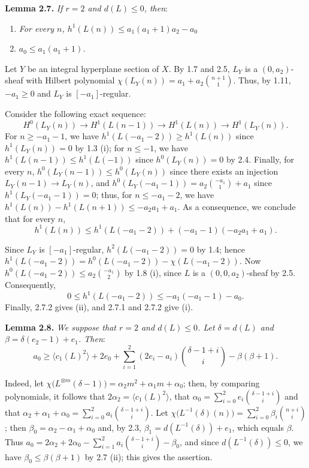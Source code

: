 \textbf{Lemma 2.7.} \emph{If \(r=2\) and \(d(L)\le0\), then}:
\begin{enumerate}[label=(\roman*)]
\item \emph{For every \(n\), \(h^1(L(n))\le a_1(a_1+1)a_2-a_0\)}
\item \emph{\(a_0\le a_1(a_1+1)\).}
\end{enumerate}

Let \(Y\) be an integral hyperplane section of \(X\). By 1.7 and 2.5, \(L_Y\) is a \((0,a_2)\)-sheaf with Hilbert polynomial \(\chi(L_Y(n))=a_1+a_2\binom{n+1}{1}\). Thus, by 1.11, \(-a_1\ge0\) and \(L_Y\) is \([-a_1]\)-regular.

Consider the following exact sequence:
\[
H^0(L_Y(n))\longrightarrow H^1(L(n-1))
\longrightarrow H^1(L(n))\longrightarrow H^1(L_Y(n)).
\]
For \(n\ge -a_1-1\), we have \(h^1(L(-a_1-2))\ge h^1(L(n))\) since \(h^1(L_Y(n))=0\) by 1.3 (i); for \(n\le -1\), we have \(h^1(L(n-1))\le h^1(L(-1))\) since \(h^0(L_Y(n))=0\) by 2.4. Finally, for every \(n\), \(h^0(L_Y(n-1))\le h^0(L_Y(n))\) since there exists an injection \(L_Y(n-1)\longrightarrow L_Y(n)\), and \(h^0(L_Y(-a_1-1))=a_2\binom{-a_1}{1}+a_1\) since \(h^1(L_Y(-a_1-1))=0\); thus, for \(n\le -a_1-2\), we have \(h^1(L(n))-h^1(L(n+1))\le -a_2a_1+a_1\). As a consequence, we conclude that for every \(n\),
\[
h^1(L(n))\le h^1(L(-a_1-2))+(-a_1-1)(-a_2a_1+a_1).
\tag{2.7.1}
\]

%
Since \(L_Y\) is \([-a_1]\)-regular, \(h^2(L(-a_1-2))=0\) by 1.4; hence \(h^1(L(-a_1-2))=h^0(L(-a_1-2))-\chi(L(-a_1-2))\). Now \(h^0(L(-a_1-2))\le a_2\binom{-a_1}{2}\) by 1.8 (i), since \(L\) is a \((0,0,a_2)\)-sheaf by 2.5. Consequently,
\[
0\le h^1(L(-a_1-2))\le -a_1(-a_1-1)-a_0.
\tag{2.7.2}
\]
Finally, 2.7.2 gives (ii), and 2.7.1 and 2.7.2 give (i).

\textbf{Lemma 2.8.} \emph{We suppose that \(r=2\) and \(d(L)\le0\). Let \(\delta=d(L)\) and \(\beta=\delta(e_2-1)+e_1\). Then}:
\[
a_0\ge
\langle c_1(L)^2\rangle+2e_0+
\sum_{i=1}^{2}(2e_i-a_i)\binom{\delta-1+i}{i}
-\beta(\beta+1).
\]

Indeed, let \(\chi\bigl(L^{\otimes m}(\delta-1)\bigr)=\alpha_2m^2+\alpha_1m+\alpha_0\); then, by comparing polynomials, it follows that \(2\alpha_2=\langle c_1(L)^2\rangle\), that \(\alpha_0=\sum_{i=0}^{2}e_i\binom{\delta-1+i}{i}\) and that \(\alpha_2+\alpha_1+\alpha_0=\sum_{i=0}^{2}a_i\binom{\delta-1+i}{i}\). Let \(\chi\bigl(L^{-1}(\delta)(n)\bigr)=\sum_{i=0}^{2}\beta_i\binom{n+i}{i}\); then \(\beta_0=\alpha_2-\alpha_1+\alpha_0\) and, by 2.3, \(\beta_1=d(L^{-1}(\delta))+e_1\), which equals \(\beta\). Thus \(a_0=2\alpha_2+2\alpha_0-\sum_{i=1}^{2}a_i\binom{\delta-1+i}{i}-\beta_0\), and since \(d(L^{-1}(\delta))\le0\), we have \(\beta_0\le\beta(\beta+1)\) by 2.7 (ii); this gives the assertion.

